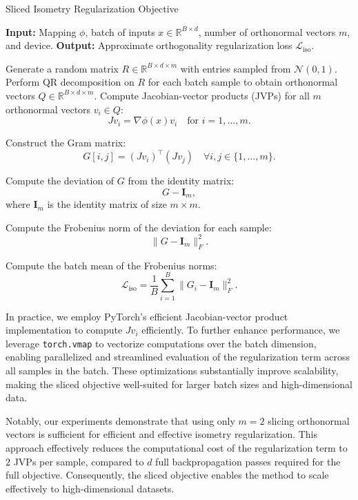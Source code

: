 \begin{algorithm}
    \caption{Sliced Isometry Regularization Objective}
    \label{alg:approx_isometry}
    \begin{algorithmic}[1]
        \STATE \textbf{Input:} Mapping \(\phi\), batch of inputs \(x \in \mathbb{R}^{B \times d}\), number of orthonormal vectors \(m\), and device.
        \STATE \textbf{Output:} Approximate orthogonality regularization loss \(\mathcal{L}_{\text{iso}}\).

        \STATE Generate a random matrix \(R \in \mathbb{R}^{B \times d \times m}\) with entries sampled from \(\mathcal{N}(0, 1)\).
        \STATE Perform QR decomposition on \(R\) for each batch sample to obtain orthonormal vectors \(Q \in \mathbb{R}^{B \times d \times m}\).
        \STATE Compute Jacobian-vector products (JVPs) for all \(m\) orthonormal vectors \(v_i \in Q\):
        \[
        Jv_i = \nabla \phi(x) v_i \quad \text{for } i = 1, \dots, m.
        \]

        \STATE Construct the Gram matrix:
        \[
        G[i, j] = (Jv_i)^\top (Jv_j) \quad \forall i, j \in \{1, \dots, m\}.
        \]

        \STATE Compute the deviation of \(G\) from the identity matrix:
        \[
        G - \mathbf{I}_m,
        \]
        where \(\mathbf{I}_m\) is the identity matrix of size \(m \times m\).

        \STATE Compute the Frobenius norm of the deviation for each sample:
        \[
        \| G - \mathbf{I}_m \|_F^2.
        \]

        \STATE Compute the batch mean of the Frobenius norms:
        \[
        \mathcal{L}_{\text{iso}} = \frac{1}{B} \sum_{i=1}^B \| G_i - \mathbf{I}_m \|_F^2.
        \]
    \end{algorithmic}
\end{algorithm}

In practice, we employ PyTorch's efficient Jacobian-vector product implementation to compute \(J v_i\) efficiently. To further enhance performance, we leverage \texttt{torch.vmap} to vectorize computations over the batch dimension, enabling parallelized and streamlined evaluation of the regularization term across all samples in the batch. These optimizations substantially improve scalability, making the sliced objective well-suited for larger batch sizes and high-dimensional data.

Notably, our experiments demonstrate that using only \(m = 2\) slicing orthonormal vectors is sufficient for efficient and effective isometry regularization. This approach effectively reduces the computational cost of the regularization term to \(2\) JVPs per sample, compared to \(d\) full backpropagation passes required for the full objective. Consequently, the sliced objective enables the method to scale effectively to high-dimensional datasets.

